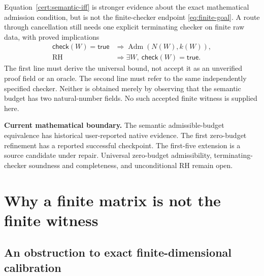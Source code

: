 \documentclass[11pt,a4paper]{article}
\numberwithin{equation}{section}
\theoremstyle{definition}
\theoremstyle{remark}
\newcommand{\RH}{\mathrm{RH}}
\begin{document}
Equation~\eqref{cert:semantic-iff} is stronger evidence about the exact
mathematical admission condition, but is not the finite-checker endpoint
\eqref{eq:finite-goal}. A route through cancellation still needs one
explicit terminating checker on finite raw data, with proved implications
\begin{align}
\mathsf{check}(W)=\mathsf{true}
&\Longrightarrow\operatorname{Adm}(N(W),k(W)),\label{cert:checker-sound}\\
\RH&\Longrightarrow\exists W,\ \mathsf{check}(W)=\mathsf{true}.
\label{cert:checker-complete}
\end{align}
The first line must derive the universal bound, not accept it as an
unverified proof field or an oracle. The second line must refer to the
same independently specified checker. Neither is obtained merely by
observing that the semantic budget has two natural-number fields.
No such accepted finite witness is supplied here.

\begin{scopebox}
\textbf{Current mathematical boundary.} The semantic admissible-budget
equivalence has historical user-reported native evidence. The first
zero-budget refinement has a reported successful checkpoint. The first-five
extension is a source candidate under repair. Universal zero-budget
admissibility, terminating-checker soundness and completeness, and
unconditional RH remain open.
\end{scopebox}

\section[Finite matrices and witnesses]{Why a finite matrix is not the finite witness}\label{sec:finite}

\subsection{An obstruction to exact finite-dimensional calibration}
\end{document}
